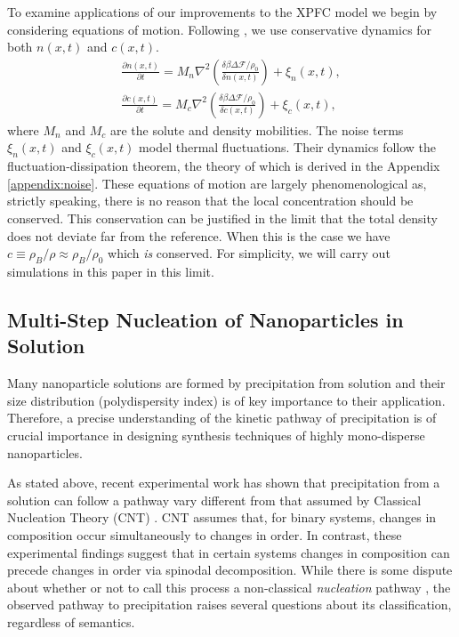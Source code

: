 \documentclass[showkeys, prb, reprint]{revtex4-1}
\renewcommand{\d}{\delta}       %
\newcommand{\F}{\mathcal{F}}    %
\renewcommand{\l}{\left}        %
\renewcommand{\r}{\right}       %
\newcommand{\f}{\frac}          %
\newcommand{\B}{\rho_B}         %
\begin{document}
To examine applications of our improvements to the XPFC model we begin by
considering equations of motion. Following \cite{GREENWOOD11_BINARY}, we use
conservative dynamics for both $n(x, t)$ and $c(x, t)$.
%
\begin{gather}
    \f{\partial n(x, t)}{\partial t} = 
        M_n \nabla^2\l(\f{\d \beta \Delta\F / \rho_0}{\d n(x, t)}\r) 
        + \xi_n(x, t), \\ 
    \f{\partial c(x, t)}{\partial t} = 
        M_c \nabla^2\l(\f{\d \beta \Delta \F / \rho_0}{\d c(x, t)}\r)
        + \xi_c(x, t),
\end{gather}
%
where $M_n$ and $M_c$ are the solute and density mobilities. The noise terms
$\xi_n(x, t)$ and $\xi_c(x, t)$ model thermal fluctuations. Their dynamics
follow the fluctuation-dissipation theorem, the theory of which is derived in
the Appendix \ref{appendix:noise}. These equations of motion are largely
phenomenological as, strictly speaking, there is no reason that the local
concentration should be conserved.  This conservation can be justified in the
limit that the total density does not deviate far from the reference. When this
is the case we have $c \equiv \B / \rho \approx \B / \rho_0$ which \textit{is}
conserved. For simplicity, we will carry out simulations in this paper in
this limit.

\subsection{Multi-Step Nucleation of Nanoparticles in Solution} %


Many nanoparticle solutions are formed by precipitation from solution and their
size distribution (polydispersity index) is of key importance to their
application. Therefore, a precise understanding of the kinetic pathway of
precipitation is of crucial importance in designing synthesis techniques of
highly mono-disperse nanoparticles.

As stated above, recent experimental work has shown that precipitation from a
solution can follow a pathway vary different from that assumed by Classical
Nucleation Theory (CNT) \cite{LOH17, WALLACE13}. CNT assumes that, for binary
systems, changes in composition occur simultaneously to changes in order. In
contrast, these experimental findings suggest that in certain systems changes
in composition can precede changes in order via spinodal decomposition. While
there is some dispute about whether or not to call this process a non-classical
\textit{nucleation} pathway \cite{DAVEY13, GEBAUER11}, the observed pathway to
precipitation raises several questions about its classification, regardless of
semantics.
\end{document}
